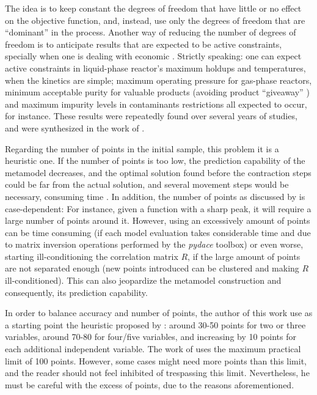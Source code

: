\documentclass[../msc-thesis.tex]{subfiles}
\begin{document}
The idea is to keep constant the degrees of freedom that have little or no 
effect on the objective function, and, instead, use only the degrees of 
freedom that are ``dominant'' in the process. Another way of reducing the 
number of degrees of freedom is to anticipate results that are expected to 
be active constraints, specially when one is dealing with economic \soc. 
Strictly speaking: one can expect active constraints in liquid-phase reactor's 
maximum holdups and temperatures, when the kinetics are simple; maximum 
operating pressure for gas-phase reactors, minimum acceptable purity for 
valuable products (avoiding product ``giveaway'' \cite{Jacobsen2011}) and 
maximum impurity levels in contaminants restrictions all expected to occur, 
for instance. These results were repeatedly found over several years of \soc 
studies, and were synthesized in the work of \textcite{Minasidis2015}.

Regarding the number of points in the initial sample, this problem it is a 
heuristic one. If the number of points is too low, the prediction capability of 
the metamodel decreases, and the optimal solution found before the contraction 
steps could be far from the actual solution, and several movement steps would 
be necessary, consuming time \cite{Caballero2008}. In addition, the number of 
points as discussed by \textcite{Caballero2008} is case-dependent: For instance, 
given a function with a sharp peak, it will require a large number of points 
around it. However, using an excessively amount of points can be time consuming 
(if each model evaluation takes considerable time and due to matrix inversion 
operations performed by the \textit{pydace} toolbox) or even worse, starting 
ill-conditioning the correlation matrix $R$, if the large amount of points are 
not separated enough (new points introduced can be clustered and making $R$ 
ill-conditioned). This can also jeopardize the \kriging metamodel construction 
and consequently, its prediction capability.

In order to balance accuracy and number of points, the author of this work use 
as a starting point the heuristic proposed by \cite{Caballero2008}: around 
30-50 points for two or three variables, around 70-80 for four/five variables, 
and increasing by 10 points for each additional independent variable. The work 
of \textcite{Caballero2008} uses the maximum practical limit of 100 points. 
However, some cases might need more points than this limit, and the reader 
should not feel inhibited of trespassing this limit. Nevertheless, he must be 
careful with the excess of points, due to the reasons aforementioned.
\end{document}
